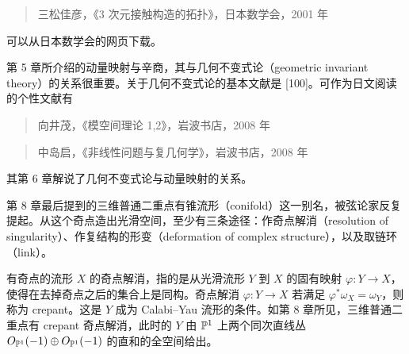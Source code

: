\begin{quote}
\noindent [三松 01] 三松佳彦，《3 次元接触构造的拓扑》，日本数学会，2001 年
\end{quote}
可以从日本数学会的网页下载。

第 5 章所介绍的动量映射与辛商，其与几何不变式论（geometric invariant theory）的关系很重要。关于几何不变式论的基本文献是 [100]。可作为日文阅读的个性文献有
\begin{quote}
\noindent [向井 08] 向井茂，《模空间理论 1,2》，岩波书店，2008 年
\end{quote}
\begin{quote}
\noindent [中岛 08] 中岛启，《非线性问题与复几何学》，岩波书店，2008 年
\end{quote}
其第 6 章解说了几何不变式论与动量映射的关系。

第 8 章最后提到的三维普通二重点有锥流形（conifold）这一别名，被弦论家反复提起。从这个奇点造出光滑空间，至少有三条途径：作奇点解消（resolution of singularity）、作复结构的形变（deformation of complex structure），以及取链环（link）。

有奇点的流形 $X$ 的奇点解消，指的是从光滑流形 $Y$ 到 $X$ 的固有映射 $\varphi:Y\to X$，使得在去掉奇点之后的集合上是同构。奇点解消 $\varphi:Y\to X$ 若满足 $\varphi^*\omega_X=\omega_Y$，则称为 crepant。这是 $Y$ 成为 Calabi–Yau 流形的条件。如第 8 章所见，三维普通二重点有 crepant 奇点解消，此时的 $Y$ 由 $\mathbb{P}^1$ 上两个同次直线丛 $O_{\mathbb{P}^1}(-1)\oplus O_{\mathbb{P}^1}(-1)$ 的直和的全空间给出。

